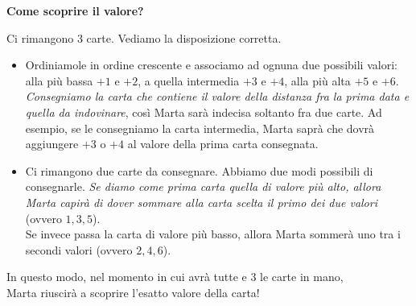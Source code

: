 \documentclass[8pt]{beamer}
\theoremstyle{plain}
\theoremstyle{definition}
\begin{document}
\begin{frame}
\begin{center}
\textbf{Come scoprire il valore?}

\medskip
\medskip
\medskip

Ci rimangono 3 carte. Vediamo la disposizione corretta. \begin{itemize}
\item Ordiniamole in ordine crescente e associamo ad ognuna due possibili valori: \\alla più bassa $+1$ e $+2$, a quella intermedia $+3$ e $+4$, alla più alta $+5$ e $+6$. \\ \textit{Consegniamo la carta che contiene il valore della distanza fra la prima data e quella da indovinare}, così Marta sarà indecisa soltanto fra due carte. Ad esempio, se le consegniamo la carta intermedia, Marta saprà che dovrà aggiungere $+3$ o $+4$ al valore della prima carta consegnata.
\end{itemize}
\end{center}
\end{frame}

\begin{frame}
\begin{center}
\begin{itemize}
\item Ci rimangono due carte da consegnare. Abbiamo due modi possibili di consegnarle. \emph{Se diamo come prima carta quella di valore più alto, allora Marta capirà di dover sommare alla carta scelta il primo dei due valori} (ovvero $1,3,5$). \\Se invece passa la carta di valore più basso, allora Marta sommerà uno tra i secondi valori (ovvero $2,4,6$).

\end{itemize}

\smallskip
\medskip

In questo modo, nel momento in cui avrà tutte e 3 le carte in mano, \\Marta riuscirà a scoprire l'esatto valore della carta!
\end{center}
\end{frame}
\end{document}
